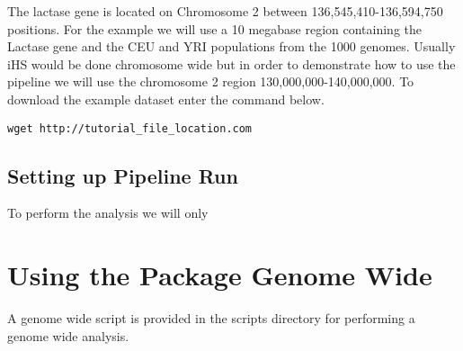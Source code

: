 \documentclass[a4paper,10pt]{article}
\begin{document}
The lactase gene is located on Chromosome 2 between 136,545,410-136,594,750 positions. For the example we will use a 10 megabase region containing the Lactase gene and the CEU and YRI populations from the 1000 genomes. Usually iHS would be done chromosome wide but in order to demonstrate how to use the pipeline we will use the chromosome 2 region 130,000,000-140,000,000. To download the example dataset enter the command below. 

\begin{verbatim}
wget http://tutorial_file_location.com 
\end{verbatim}

\subsection{Setting up Pipeline Run}
To perform the analysis we will only  


\section{Using the Package Genome Wide}
A genome wide script is provided in the scripts directory for performing a genome wide analysis.











\end{document}
